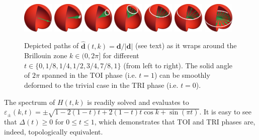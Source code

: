 \begin{figure}[ht]
    \centering
    \includegraphics[width=0.13\textwidth]{figures/ssh_deformed_normalized_bloch_vector_t0_000.jpg}
    \includegraphics[width=0.13\textwidth]{figures/ssh_deformed_normalized_bloch_vector_t0_125.jpg}
    \includegraphics[width=0.13\textwidth]{figures/ssh_deformed_normalized_bloch_vector_t0_250.jpg}
    \includegraphics[width=0.13\textwidth]{figures/ssh_deformed_normalized_bloch_vector_t0_500.jpg}
    \includegraphics[width=0.13\textwidth]{figures/ssh_deformed_normalized_bloch_vector_t0_750.jpg}
    \includegraphics[width=0.13\textwidth]{figures/ssh_deformed_normalized_bloch_vector_t0_825.jpg}
    \includegraphics[width=0.13\textwidth]{figures/ssh_deformed_normalized_bloch_vector_t1_000.jpg}
    \caption{Depicted paths of $\hat{\bm d}(t,k)={\bm d}/|{\bm d}|$ (see text) as it wraps around the Brillouin zone $k\in(0,2\pi]$ for different $t\in\{0,1/8,1/4,1/2,3/4,7/8,1\}$ (from left to right). The solid angle of $2\pi$ spanned in the TOI phase (i.e. $t=1$) can be smoothly deformed to the trivial case in the TRI phase (i.e. $t=0$).}
    \label{fig:ssh_deformed}
\end{figure}
The spectrum of $H(t,k)$ is readily solved and evaluates to $\varepsilon_\pm(k,t)=\pm\sqrt{1-2(1-t)t+2(1-t)t\cos k+\sin(\pi t)}$.
It is easy to see that $\Delta({t})\geq0$ for $0\leq t\leq1$, which demonstrates that TOI and TRI phases are, indeed, topologically equivalent.

